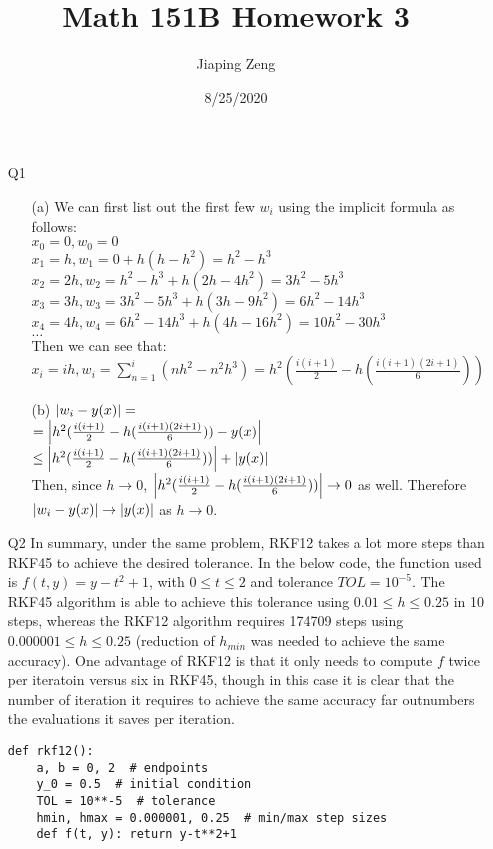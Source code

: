 \documentclass{article}
\title{Math 151B Homework 3}
\date{8/25/2020}
\author{Jiaping Zeng}
\begin{document}
\maketitle

\begin{itemize}
    \item [Q1]
          \begin{itemize}
              \item [(a)] We can first list out the first few $w_i$ using the implicit formula as follows:\\$x_0=0, w_0=0$\\$x_1=h,w_1=0+h(h-h^2)=h^2-h^3$\\$x_2=2h,w_2=h^2-h^3+h(2h-4h^2)=3h^2-5h^3$\\$x_3=3h,w_3=3h^2-5h^3+h(3h-9h^2)=6h^2-14h^3$\\$x_4=4h,w_4=6h^2-14h^3+h(4h-16h^2)=10h^2-30h^3$\\$\ldots$\\Then we can see that:\\$x_i=ih,w_i=\sum_{n=1}^i(nh^2-n^2h^3)=h^2(\frac{i(i+1)}{2}-h(\frac{i(i+1)(2i+1)}{6}))$
              \item [(b)] $\abs{w_i-y(x)}=$\\$=\abs{h^2(\frac{i(i+1)}{2}-h(\frac{i(i+1)(2i+1)}{6}))-y(x)}$\\$\leq\abs{h^2(\frac{i(i+1)}{2}-h(\frac{i(i+1)(2i+1)}{6}))}+\abs{y(x)}$\\Then, since $h\rightarrow 0$, $\abs{h^2(\frac{i(i+1)}{2}-h(\frac{i(i+1)(2i+1)}{6}))}\rightarrow 0$ as well. Therefore $\abs{w_i-y(x)}\rightarrow \abs{y(x)}$ as $h\rightarrow 0$.
          \end{itemize}
    \item [Q2]
    In summary, under the same problem, RKF12 takes a lot more steps than RKF45 to achieve the desired tolerance. In the below code, the function used is $f(t,y)=y-t^2+1$, with $0\leq t\leq 2$ and tolerance $TOL=10^{-5}$. The RKF45 algorithm is able to achieve this tolerance using $0.01\leq h\leq 0.25$ in 10 steps, whereas the RKF12 algorithm requires 174709 steps using $0.000001\leq h\leq 0.25$ (reduction of $h_{min}$ was needed to achieve the same accuracy). One advantage of RKF12 is that it only needs to compute $f$ twice per iteratoin versus six in RKF45, though in this case it is clear that the number of iteration it requires to achieve the same accuracy far outnumbers the evaluations it saves per iteration.
          \begin{verbatim}
def rkf12():
    a, b = 0, 2  # endpoints
    y_0 = 0.5  # initial condition
    TOL = 10**-5  # tolerance
    hmin, hmax = 0.000001, 0.25  # min/max step sizes
    def f(t, y): return y-t**2+1


\end{verbatim}
\end{itemize}
\end{document}
